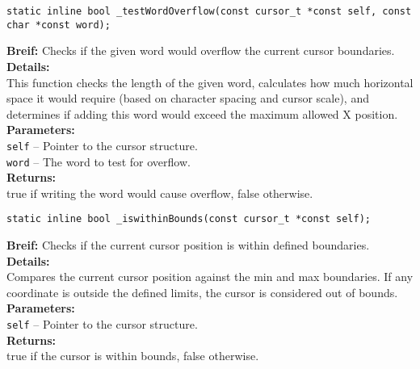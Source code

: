 \begin{verbatim}
static inline bool _testWordOverflow(const cursor_t *const self, const char *const word);
\end{verbatim}
\textbf{Breif:} Checks if the given word would overflow the current cursor boundaries. \\
\textbf{Details:} \\
\hspace*{1cm}This function checks the length of the given word, calculates how much horizontal space it would require (based on character spacing and cursor scale), and determines if adding this word would exceed the maximum allowed X position. \\
\textbf{Parameters:} \\
\hspace*{1cm}\texttt{self} -- Pointer to the cursor structure. \\
\hspace*{1cm}\texttt{word} -- The word to test for overflow. \\
\textbf{Returns:} \\
\hspace*{1cm}true if writing the word would cause overflow, false otherwise. \\[1em]

\begin{verbatim}
static inline bool _iswithinBounds(const cursor_t *const self);
\end{verbatim}
\textbf{Breif:} Checks if the current cursor position is within defined boundaries. \\
\textbf{Details:} \\
\hspace*{1cm}Compares the current cursor position against the min and max boundaries. If any coordinate is outside the defined limits, the cursor is considered out of bounds. \\
\textbf{Parameters:} \\
\hspace*{1cm}\texttt{self} -- Pointer to the cursor structure. \\
\textbf{Returns:} \\
\hspace*{1cm}true if the cursor is within bounds, false otherwise. \\[1em]

